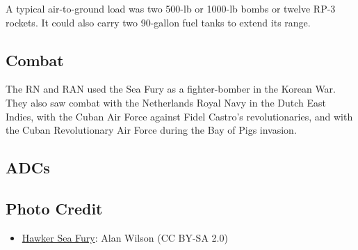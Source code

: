 A typical air-to-ground load was two 500-lb or 1000-lb bombs or twelve RP-3 rockets. It could also carry two 90-gallon fuel tanks to extend its range.

\subsection{Combat}

The RN and RAN used the Sea Fury as a fighter-bomber in the Korean War. They also saw combat with the Netherlands Royal Navy in the Dutch East Indies, with the Cuban Air Force against Fidel Castro's revolutionaries, and with the Cuban Revolutionary Air Force during the Bay of Pigs invasion.

\subsection{ADCs}

\begin{adclist}
\end{adclist}

\subsection{Photo Credit}
\begin{itemize}\raggedright
    \item \href{https://commons.wikimedia.org/wiki/File:Hawker_Fury_FB.11_‘SR661’_(G-CBEL)_(35902999510).jpg}{Hawker Sea Fury}: Alan Wilson (CC BY-SA 2.0)
\end{itemize}
